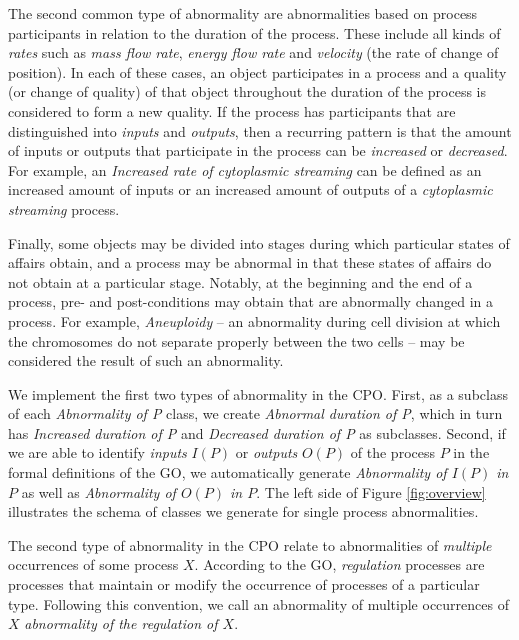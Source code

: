 \documentclass[12pt]{article}
\begin{document}
The second common type of abnormality are abnormalities based on
process participants in relation to the duration of the process. These
include all kinds of {\em rates} such as {\em mass flow rate}, {\em
  energy flow rate} and {\em velocity} (the rate of change of
position). In each of these cases, an object participates in a process
and a quality (or change of quality) of that object throughout the
duration of the process is considered to form a new quality. If the
process has participants that are distinguished into {\em inputs} and
{\em outputs}, then a recurring pattern is that the amount of inputs
or outputs that participate in the process can be {\em increased} or
{\em decreased}. For example, an {\em Increased rate of cytoplasmic
  streaming} can be defined as an increased amount of inputs or an
increased amount of outputs of a {\em cytoplasmic streaming} process.

Finally, some objects may be divided into stages during which
particular states of affairs obtain, and a process may be abnormal in
that these states of affairs do not obtain at a particular
stage. Notably, at the beginning and the end of a process, pre- and
post-conditions may obtain that are abnormally changed in a
process. For example, {\em Aneuploidy} -- an abnormality during cell
division at which the chromosomes do not separate properly between the
two cells -- may be considered the result of such an abnormality.

We implement the first two types of abnormality in the CPO. First, as
a subclass of each {\em Abnormality of P} class, we create {\em
  Abnormal duration of P}, which in turn has {\em Increased duration
  of P} and {\em Decreased duration of P} as subclasses. Second, if we
are able to identify {\em inputs} $I(P)$ or {\em outputs} $O(P)$ of
the process $P$ in the formal definitions of the GO, we automatically
generate {\em Abnormality of $I(P)$ in $P$} as well as {\em
  Abnormality of $O(P)$ in $P$}.  The left side of Figure
\ref{fig:overview} illustrates the schema of classes we generate for
single process abnormalities.

The second type of abnormality in the CPO relate to abnormalities of
{\em multiple} occurrences of some process $X$. According to the GO,
{\em regulation} processes are processes that maintain or modify the
occurrence of processes of a particular type. Following this
convention, we call an abnormality of multiple occurrences of $X$ {\em
  abnormality of the regulation of $X$}.
\end{document}
